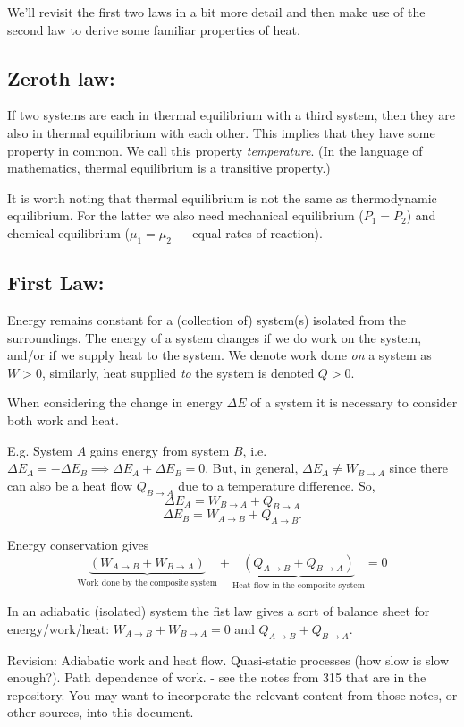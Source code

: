 We'll revisit the first two laws in a bit more detail and then make use of the second law to derive some familiar properties of heat.

\subsection*{Zeroth law:}
If two systems are each in thermal equilibrium with a third system, then they are  also in thermal equilibrium with each other. This implies that they have some property in common. We call this property \emph{temperature}. (In the language of mathematics, thermal equilibrium is a transitive property.)

It is worth noting that thermal equilibrium is not the same as thermodynamic equilibrium. For the latter we also need mechanical equilibrium ($P_1=P_2$) and chemical equilibrium ($\mu_1=\mu_2$ --- equal rates of reaction).

\subsection*{First Law:}
Energy remains constant for a (collection of) system(s) isolated from the surroundings. The energy of a system changes if we do work on the system, and/or if we supply heat to the system. We denote work done \emph{on} a system as $W>0$, similarly, heat supplied \emph{to} the system is denoted $Q>0$.

When considering the change in energy $\Delta E$ of a system it is necessary to consider both work and heat.

E.g. System $A$ gains energy from system $B$, i.e. $\Delta E_A = -\Delta E_B \implies \Delta E_A + \Delta E_B =0$. But, in general, $\Delta E_A\neq W_{B\rightarrow A}$ since there can also be a heat flow $Q_{B\rightarrow A}$ due to a temperature difference.
So,
$$\Delta E_A = W_{B\rightarrow A} + Q_{B\rightarrow A}$$
$$\Delta E_B = W_{A\rightarrow B} + Q_{A\rightarrow B}.$$

Energy conservation gives 
$$\underbrace{(W_{A\rightarrow B}+W_{B\rightarrow A})}_{\text{Work done by the composite system}} + \underbrace{(Q_{A\rightarrow B}+Q_{B\rightarrow A})}_{\text{Heat flow in the composite system}} = 0$$

In an adiabatic (isolated) system the fist law gives a sort of balance sheet for energy/work/heat:
$W_{A\rightarrow B}+W_{B\rightarrow A} = 0$ and $Q_{A\rightarrow B}+Q_{B\rightarrow A}$.

Revision: Adiabatic work and heat flow. Quasi-static processes (how slow is slow enough?). Path dependence of work.
 - see the notes from 315 that are in the repository. You may want to incorporate the relevant content from those notes, or other sources, into this document.


